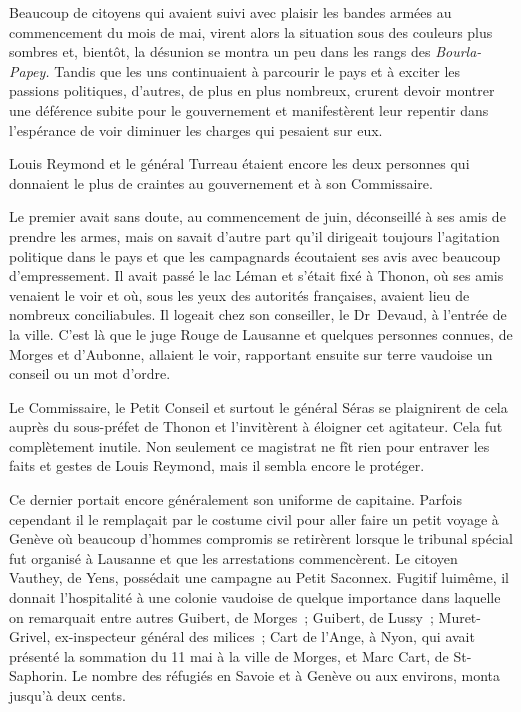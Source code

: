 \documentclass[french,twoside]{book} %
\begin{document}
Beaucoup de citoyens qui avaient suivi avec plaisir les bandes armées au commencement du mois de mai, virent alors la situation sous des couleurs plus sombres et, bientôt, la désunion se montra un peu dans les rangs des \emph{Bourla-Papey.} Tandis que les uns continuaient à parcourir le pays et à exciter les passions politiques, d’autres, de plus en plus nombreux, crurent devoir montrer une déférence subite pour le gouvernement et manifestèrent leur repentir dans l’espérance de voir diminuer les charges qui pesaient sur eux.\par
Louis Reymond et le général Turreau étaient encore les deux personnes qui donnaient le plus de craintes au gouvernement et à son Commissaire.\par
Le premier avait sans doute, au commencement de juin, déconseillé à ses amis de prendre les armes, mais on savait d’autre part qu’il dirigeait toujours l’agitation politique dans le pays et que les campagnards écoutaient ses avis avec beaucoup d’empressement. Il avait passé le lac Léman et s’était fixé à Thonon, où ses amis venaient le voir et où, sous les yeux des autorités françaises, avaient lieu de nombreux conciliabules. Il logeait chez son conseiller, le Dr Devaud, à l’entrée de la ville. C’est là que le juge Rouge de Lausanne et quelques personnes connues, de Morges et d’Aubonne, allaient le voir, rapportant ensuite sur terre vaudoise un conseil ou un mot d’ordre.\par
Le Commissaire, le Petit Conseil et surtout le général Séras se plaignirent de cela auprès du sous-préfet de Thonon et l’invitèrent à éloigner cet agitateur. Cela fut complètement inutile. Non seulement ce magistrat ne fît rien pour entraver les faits et gestes de Louis Reymond, mais il sembla encore le protéger.\par
Ce dernier portait encore généralement son uniforme de capitaine. Parfois cependant il le remplaçait par le costume civil pour aller faire un petit voyage à Genève où beaucoup d’hommes compromis se retirèrent lorsque le tribunal spécial fut organisé à Lausanne et que les arrestations commencèrent. Le citoyen Vauthey, de Yens, possédait une campagne au Petit Saconnex. Fugitif luimême, il donnait l’hospitalité à une colonie vaudoise de quelque importance dans laquelle on remarquait entre autres Guibert, de Morges ; Guibert, de Lussy ; Muret-Grivel, ex-inspecteur général des milices ; Cart de l’Ange, à Nyon, qui avait présenté la sommation du 11 mai à la ville de Morges, et Marc Cart, de St-Saphorin. Le nombre des réfugiés en Savoie et à Genève ou aux environs, monta jusqu’à deux cents.\par
\end{document}
